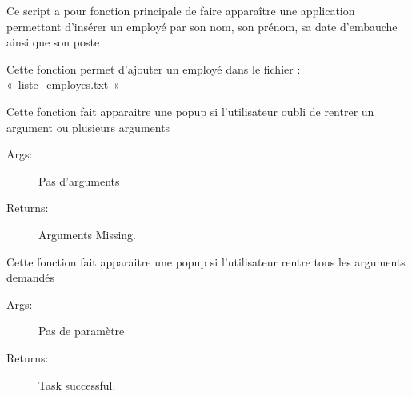\documentclass[letterpaper,10pt,french]{sphinxmanual}
\begin{document}
\sphinxAtStartPar
Ce script a pour fonction principale de faire apparaître une application permettant d’insérer un employé par son nom, son prénom,
sa date d’embauche ainsi que son poste

\begin{fulllineitems}
\label{\detokenize{add_new_employees:add_new_employees.main.btn_clicked}}
\sphinxAtStartPar
Cette fonction permet d’ajouter un employé dans le fichier : « liste\_employes.txt »

\end{fulllineitems}


\begin{fulllineitems}
\label{\detokenize{add_new_employees:add_new_employees.main.error_popup}}
\sphinxAtStartPar
Cette fonction fait apparaitre une popup si l’utilisateur oubli de rentrer un argument ou plusieurs arguments
\begin{description}
\item[{Args:}] \leavevmode
\sphinxAtStartPar
Pas d’arguments

\item[{Returns:}] \leavevmode
\sphinxAtStartPar
Arguments Missing.

\end{description}

\end{fulllineitems}


\begin{fulllineitems}
\label{\detokenize{add_new_employees:add_new_employees.main.validate_popup}}
\sphinxAtStartPar
Cette fonction fait apparaitre une popup si l’utilisateur rentre tous les arguments demandés
\begin{description}
\item[{Args:}] \leavevmode
\sphinxAtStartPar
Pas de paramètre

\item[{Returns:}] \leavevmode
\sphinxAtStartPar
Task successful.

\end{description}

\end{fulllineitems}
\end{document}
